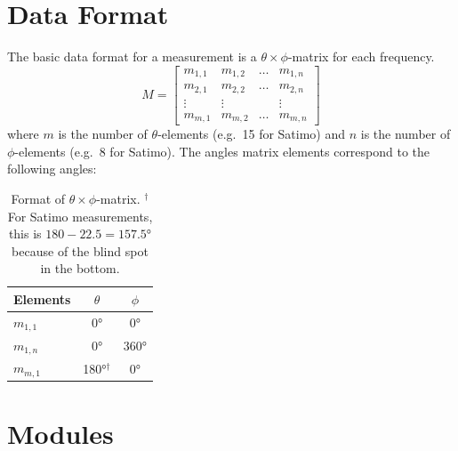 \documentclass[10pt]{article}
\begin{document}
\section{Data Format}
The basic data format for a measurement is a $\theta \times \phi$-matrix for each frequency.
\begin{equation}
    M = \begin{bmatrix}
        m_{1,1} & m_{1,2} & \dots & m_{1,n} \\
        m_{2,1} & m_{2,2} & \dots & m_{2,n} \\
        \vdots & \vdots & & \vdots \\
        m_{m,1} & m_{m,2} & \dots & m_{m,n}
    \end{bmatrix}
\end{equation}
where $m$ is the number of $\theta$-elements (e.g.\ 15 for Satimo) and $n$ is the number of $\phi$-elements (e.g.\ 8 for Satimo). The angles matrix elements correspond to the following angles:
\begin{table}[htbp]
    \centering
    \begin{tabular}{|l|c|c|}
        \hline
        Elements & $\theta$ & $\phi$ \\
        \hline
        $m_{1,1}$ & \ang{0} & \ang{0} \\
        $m_{1,n}$ & \ang{0} & $\ang{360}$ \\
        $m_{m,1}$ & \ang{180}$^{\dagger}$ & \ang{0} \\
        \hline
    \end{tabular}
    \caption{Format of $\theta\times\phi$-matrix. $^{\dagger}$For Satimo measurements, this is $180-22.5=\ang{157.5}$ because of the blind spot in the bottom.}
    \label{tab:matrixformat}
\end{table}

\section{Modules}


\clearpage
\end{document}
